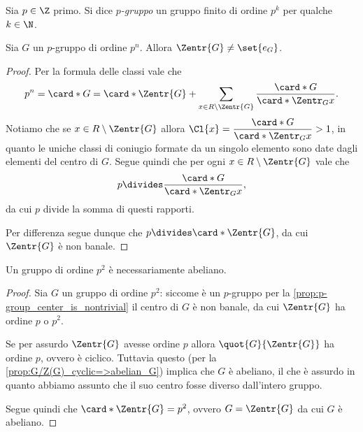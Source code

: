 \begin{definition}
    Sia $p \in \Z$ primo. Si dice \emph{$p$-gruppo} un gruppo finito di ordine $p^k$ per qualche $k \in \N$.
\end{definition}

\begin{proposition}
    \label{prop:p-group_center_is_nontrivial}
    Sia $G$ un $p$-gruppo di ordine $p^n$. Allora $\Zentr{G} \neq \set{e_G}$.
\end{proposition}
\begin{proof}
    Per la formula delle classi vale che \[
        p^n = \card*{G} = \card*{\Zentr{G}} + \sum_{x \in R \setminus \Zentr{G}} \frac{\card*{G}}{\card*{\Zentr_{G}{x}}}.
    \]
    Notiamo che se $x \in R \setminus \Zentr{G}$ allora $\Cl{x} = \dfrac{\card*{G}}{\card*{\Zentr_{G}{x}}} > 1$, in quanto le uniche classi di coniugio formate da un singolo elemento sono date dagli elementi del centro di $G$. Segue quindi che per ogni $x \in R \setminus \Zentr{G}$ vale che \[
        p \divides \frac{\card*{G}}{\card*{\Zentr_{G}{x}}},
    \] da cui $p$ divide la somma di questi rapporti.

    Per differenza segue dunque che $p \divides \card*{\Zentr{G}}$, da cui $\Zentr{G}$ è non banale.
\end{proof}

\begin{proposition}
    Un gruppo di ordine $p^2$ è necessariamente abeliano.
\end{proposition}
\begin{proof}
    Sia $G$ un gruppo di ordine $p^2$: siccome è un $p$-gruppo per la \autoref{prop:p-group_center_is_nontrivial} il centro di $G$ è non banale, da cui $\Zentr{G}$ ha ordine $p$ o $p^2$.

    Se per assurdo $\Zentr{G}$ avesse ordine $p$ allora $\quot{G}{\Zentr{G}}$ ha ordine $p$, ovvero è ciclico. Tuttavia questo (per la \autoref{prop:G/Z(G)_cyclic=>abelian_G}) implica che $G$ è abeliano, il che è assurdo in quanto abbiamo assunto che il suo centro fosse diverso dall'intero gruppo.

    Segue quindi che $\card*{\Zentr{G}} = p^2$, ovvero $G = \Zentr{G}$ da cui $G$ è abeliano.
\end{proof}